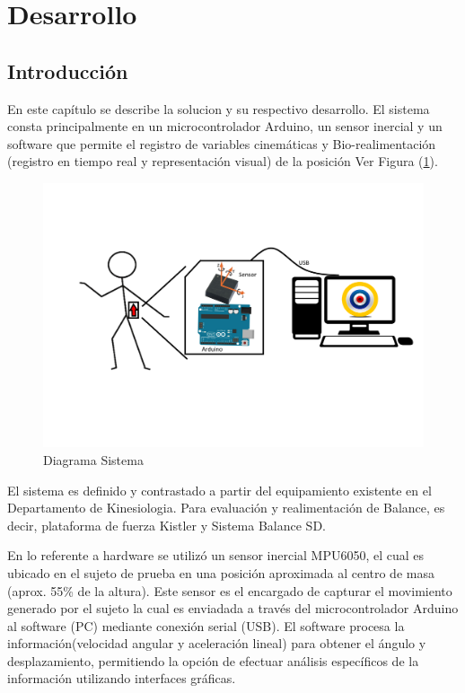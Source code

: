 \documentclass[12pt,a4paper]{article}
\begin{document}
\section{Desarrollo}
\subsection{Introducción}
En este capítulo se describe la solucion y su respectivo desarrollo.
El sistema consta principalmente en un microcontrolador Arduino, un sensor inercial y un software que permite el registro de variables cinemáticas y Bio-realimentación (registro en tiempo real y representación visual) de la posición Ver Figura (\ref{fig:diagramasistema}).

\begin{figure}[H]
	\centering
	\includegraphics[scale=0.25]{images/diagrama_sistema}
	\caption{Diagrama Sistema}
	\label{fig:diagramasistema}
\end{figure}

El sistema es definido y contrastado a partir del equipamiento existente en el Departamento de Kinesiologia. Para evaluación y realimentación de Balance, es decir, plataforma de fuerza Kistler y Sistema Balance SD.

En lo referente a hardware se utilizó un sensor inercial MPU6050, el cual es ubicado en el sujeto de prueba en una posición aproximada al centro de masa (aprox. 55\% de la altura). Este sensor es el encargado de capturar el movimiento generado por el sujeto la cual es  enviadada a través del microcontrolador Arduino al software (PC) mediante conexión serial (USB). El software procesa la información(velocidad angular y aceleración lineal) para obtener el ángulo y desplazamiento, permitiendo la opción de efectuar análisis específicos de la información utilizando interfaces gráficas.
\end{document}
